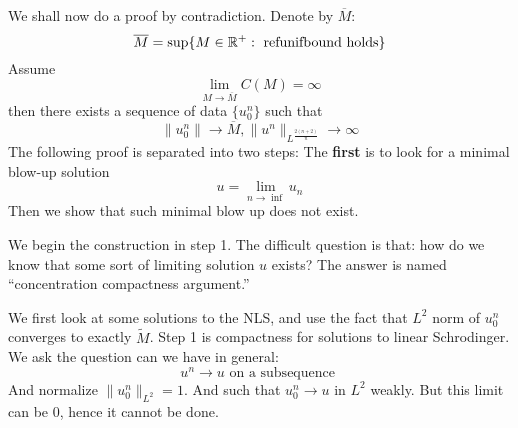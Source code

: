 We shall now do a proof by contradiction. Denote by $\overline{M}$:
\begin{equation*}
    \overline{M}=\sup\{M\in\mathbb{R}^+: \text{~ref{unifbound} holds}\}
\end{equation*}
Assume \begin{equation*}
    \lim_{M\to\overline{M}}C(M)=\infty
\end{equation*}
then there exists a sequence of data $\{u_0^n\}$ such that
\begin{equation*}
    \|u_0^n\|\to\overline{M}, \|u^n\|_{L^\frac{2(n+2)}{n}}\to\infty
\end{equation*}
The following proof is separated into two steps:
The \textbf{first} is to look for a minimal blow-up solution
\begin{equation*}
    u=\lim_{n\to\inf}u_n
\end{equation*}
Then we show that such minimal blow up does not exist.

We begin the construction in step 1. The difficult question is that: how do we know that some sort of limiting solution $u$ exists? The answer is named ``concentration compactness argument.'' 

We first look at some solutions to the NLS, and use the fact that $L^2$ norm of $u_0^n$ converges to exactly $\tilde{M}$. Step 1 is compactness for solutions to linear Schrodinger. We ask the question can we have in general:
\begin{equation*}
    u^n\to u \text{ on a subsequence }
\end{equation*}
And normalize $\|u_0^n\|_{L^2}=1$. And such that $u_0^n\to u$ in $L^2$ weakly. But this limit can be 0, hence it cannot be done.

